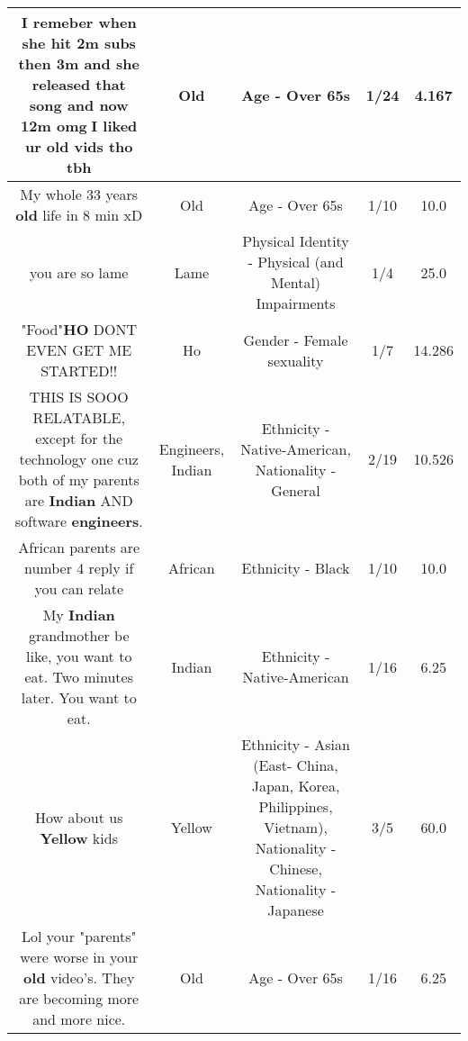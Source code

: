 \documentclass[11pt]{article}
\newlength\mylength
\begin{document}
\begin{center}
\begin{longtable}{|C{.65\mylength}|C{.30\mylength}|C{.12\mylength}|C{.12\mylength}|C{.12\mylength}|}
  \small I remeber when she hit 2m subs then 3m and she released that song and now 12m omg🤔I liked ur \textbf{old} vids tho tbh\normalsize   & Old & Age - Over 65s & 1/24 & 4.167 \\  \hline
  \small My whole 33 years \textbf{old} life in 8 min xD\normalsize   & Old & Age - Over 65s & 1/10 & 10.0 \\  \hline
  \small you are so lame\normalsize   & Lame & Physical Identity - Physical (and Mental) Impairments & 1/4 & 25.0 \\  \hline
  \small "Food"\textbf{HO} DONT EVEN GET ME STARTED!!\normalsize   & Ho & Gender - Female sexuality & 1/7 & 14.286 \\  \hline
  \small THIS IS SOOO RELATABLE, except for the technology one cuz both of my parents are \textbf{Indian} AND software \textbf{engineers}.\normalsize   & Engineers, Indian & Ethnicity - Native-American, Nationality - General & 2/19 & 10.526 \\  \hline
  \small African parents are number 4 reply if you can relate\normalsize   & African & Ethnicity - Black & 1/10 & 10.0 \\  \hline
  \small My \textbf{Indian} grandmother be like, you want to eat. Two minutes later. You want to eat.\normalsize   & Indian & Ethnicity - Native-American & 1/16 & 6.25 \\  \hline
  \small How about us \textbf{Y\textbf{e\textbf{llow}}} kids\normalsize   & Yellow & Ethnicity - Asian (East- China, Japan, Korea, Philippines, Vietnam), Nationality - Chinese, Nationality - Japanese & 3/5 & 60.0 \\  \hline
  \small Lol your "parents" were worse in your \textbf{old} video's. They are becoming more and more nice.\normalsize   & Old & Age - Over 65s & 1/16 & 6.25 \\  \hline

\end{longtable}
\end{center}
\end{document}
